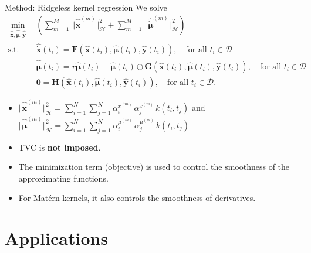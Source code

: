 \documentclass[aspectratio=169,10pt]{beamer}
\newcommand{\emphcolor}[1]{\textbf{\textcolor{emphcolorval}{#1}}}
\newcommand{\bx}{\mathbf{x}}
\newcommand{\by}{\mathbf{y}}
\newcommand{\bmu}{\boldsymbol{\mu}}
\newcommand{\bF}{\mathbf{F}}
\newcommand{\bG}{\mathbf{G}}
\newcommand{\bH}{\mathbf{H}}
\begin{document}
\begin{frame}{Method: Ridgeless kernel regression}
We solve 
\[
\begin{aligned}
	\min_{\substack{
			\hat{\dot{\bx}}, \hat{\dot{\bmu}},\hat{\dot{\by}}
	}}\, & \left(
	\sum_{m=1}^{M}\, \Vert \hat{\dot{\bx}}^{(m)} \Vert^2_{\mathcal{H}} +
	\sum_{m=1}^{M}\, \Vert \hat{\dot{\bmu}}^{(m)} \Vert^2_{\mathcal{H}}\right)\\
	\text{s.t.}~\,
	& \hat{\dot{\bx}}(t_i) = \bF(\hat{\bx}(t_i), \hat{\bmu}(t_i), \hat{\by}(t_i)),\quad\text{for all } t_i \in \mathcal{D}\\
	& \hat{\dot{\bmu}}(t_i) = r\hat{\bmu}(t_i)- \hat{\bmu}(t_i)\odot\bG(\hat{\bx}(t_i), \hat{\bmu}(t_i), \hat{\by}(t_i)),\quad\text{for all } t_i \in \mathcal{D}\\
	& \mathbf{0} = \bH(\hat{\bx}(t_i), \hat{\bmu}(t_i), \hat{\by}(t_i)),\quad\text{for all } t_i \in \mathcal{D}.
	\end{aligned}
\]
\begin{itemize}
	\item $\Vert \hat{\dot{\bx}}^{(m)} \Vert^2_{\mathcal{H}} = \textstyle\sum\limits_{i=1}^N \textstyle\sum\limits_{j=1}^N \alpha^{x^{(m)}}_i \, \alpha^{x^{(m)}}_j \, k(t_i, t_j)$ and $\Vert \hat{\dot{\bmu}}^{(m)} \Vert^2_{\mathcal{H}} = \textstyle\sum\limits_{i=1}^N \textstyle\sum\limits_{j=1}^N \alpha^{\mu^{(m)}}_i \, \alpha^{\mu^{(m)}}_j \, k(t_i, t_j)$
	\vspace{0.1in}
	\item TVC is \emphcolor{not imposed}.
		\vspace{0.1in}
	\item The minimization term (objective) is used to control the smoothness of the approximating functions.
	\vspace{0.1in}
	\item For Matérn kernels, it also controls the smoothness of derivatives. 
\end{itemize}
\end{frame}

\section{Applications}
\end{document}
